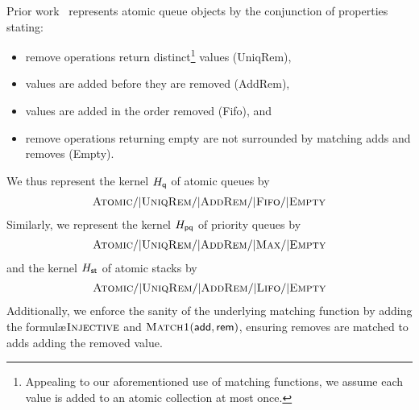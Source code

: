 \begin{example}

  Prior work~\cite{conf/tacas/AbdullaHHJR13, conf/concur/HenzingerSV13}
  represents atomic queue objects by the conjunction of properties stating:
  \begin{itemize}

    \item remove operations return distinct\footnote{Appealing to our
    aforementioned use of matching functions, we assume each value is added to
    an atomic collection at most once.} values ({\sc UniqRem}),

    \item values are added before they are removed ({\sc AddRem}),

    \item values are added in the order removed ({\sc Fifo}), and

    \item remove operations returning empty are not surrounded by matching adds
    and removes ({\sc Empty}).

  \end{itemize}
  We thus represent the kernel $H_{\sf q}$ of atomic queues by
  \begin{align*}
    \textsc{Atomic} /| \textsc{UniqRem} /| \textsc{AddRem}
      /| \textsc{Fifo} /| \textsc{Empty}
  \end{align*}
  Similarly, we represent the kernel $H_{\sf pq}$ of priority queues by
  \begin{align*}
    \textsc{Atomic} /| \textsc{UniqRem} /| \textsc{AddRem}
      /| \textsc{Max} /| \textsc{Empty}
  \end{align*}
  and the kernel $H_{\sf st}$ of atomic stacks by
  \begin{align*}
    \textsc{Atomic} /| \textsc{UniqRem} /| \textsc{AddRem}
      /| \textsc{Lifo} /| \textsc{Empty}
  \end{align*}
  Additionally, we enforce the sanity of the underlying matching function by
  adding the formul\ae $\textsc{Injective}$ and $\textsc{Match1}({\sf add},{\sf
  rem})$, ensuring removes are matched to adds adding the removed value.

\end{example}

